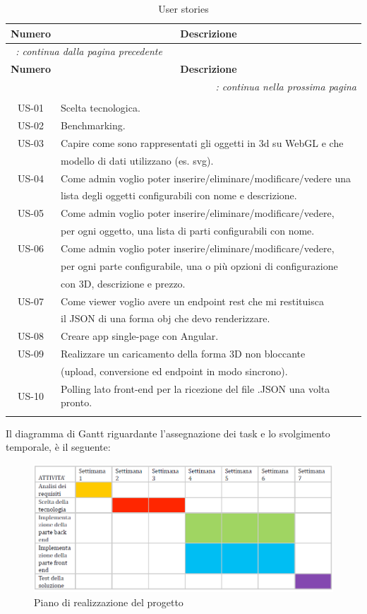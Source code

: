 \begin{longtable}{|c|l|}
	\hline
	\multicolumn{1}{|c|}{\textbf{Numero}} & \multicolumn{1}{c|}{\textbf{Descrizione}} \\
	\endfirsthead
	\multicolumn{2}{l}{\footnotesize\itshape\tablename~\thetable:
		continua dalla pagina precedente} \\
	\hline
	\multicolumn{1}{|c|}{\textbf{Numero}} & \multicolumn{1}{c|}{\textbf{Descrizione}} \\
	\endhead
	\multicolumn{2}{r}{\footnotesize\itshape\tablename~\thetable:
		continua nella prossima pagina} \\
	\endfoot
	\multicolumn{2}{r}{} \\
	\endlastfoot
	\hline
	US-01 & Scelta tecnologica.\\
	\hline
	US-02 & Benchmarking.\\
	\hline
	US-03 & Capire come sono rappresentati gli oggetti in 3d su WebGL e che\\ 
	& modello di dati utilizzano (es. svg).\\
	\hline
	US-04 & Come admin voglio poter inserire/eliminare/modificare/vedere una\\
	& lista degli oggetti configurabili con nome e descrizione.\\
	\hline
	US-05 & Come admin voglio poter inserire/eliminare/modificare/vedere,\\  & per ogni oggetto, una lista di parti configurabili con nome.\\
	\hline
	US-06 & Come admin voglio poter inserire/eliminare/modificare/vedere,\\  & per ogni parte configurabile, una o più opzioni di configurazione\\ & con 3D, descrizione e prezzo.\\
	\hline
	US-07 & Come viewer voglio avere un endpoint rest che mi restituisca\\   & il JSON di una forma obj che devo renderizzare.\\
	\hline
	US-08 & Creare app single-page con Angular.\\
	\hline
	US-09 & Realizzare un caricamento della forma 3D non bloccante\\ & (upload, conversione ed endpoint in modo sincrono).\\
	\hline
	US-10 & Polling lato front-end per la ricezione del file .JSON una volta pronto.\\
	\hline
	\caption{User stories}
	\label{tab:user:sto} \\
\end{longtable} 

Il diagramma di Gantt riguardante l'assegnazione dei task e lo svolgimento temporale, è il seguente:
\begin{figure}[h]
	\centering
	\includegraphics[scale=0.7]{Immagini/piano_realizzazione_progetto.png}
	\caption{Piano di realizzazione del progetto}
\end{figure}
